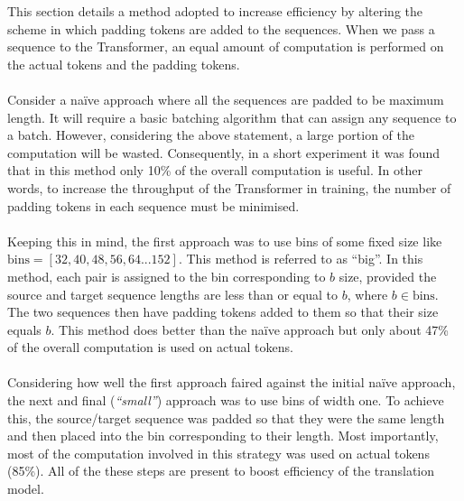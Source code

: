 \documentclass[12pt,a4paper,twoside,openright]{report}
\begin{document}
This section details a method adopted to increase efficiency by altering the scheme in which padding tokens are added to the sequences. When we pass a sequence to the Transformer, an equal amount of computation is performed on the actual tokens and the padding tokens.
\\\\
Consider a na\"ive approach where all the sequences are padded to be maximum length. It will require a basic batching algorithm that can assign any sequence to a batch. However, considering the above statement, a large portion of the computation will be wasted. Consequently, in a short experiment it was found that in this method only 10\% of the overall computation is useful. In other words, to increase the throughput of the Transformer in training, the number of padding tokens in each sequence must be minimised.
\\\\
Keeping this in mind, the first approach  was to use bins of some fixed size like \\$\text{bins} = [32, 40, 48, 56, 64...152]$. This method is referred to as ``big''. In this method, each pair is assigned to the bin corresponding to $b$ size, provided the source and target sequence lengths are less than or equal to $b$, where $b \in \text{bins}$. The two sequences then have padding tokens added to them so that their size equals $b$. This method does better than the na\"ive approach but only about 47\% of the overall computation is used on actual tokens.
\\\\
Considering how well the first approach faired against the initial na\"ive approach, the next and final (\textit{``small''}) approach was to use bins of width one. To achieve this, the source/target sequence was padded so that they were the same length and then placed into the bin corresponding to their length. Most importantly, most of the computation involved in this strategy was used on actual tokens (85\%). All of the these steps are present to boost efficiency of the translation model.
\end{document}
